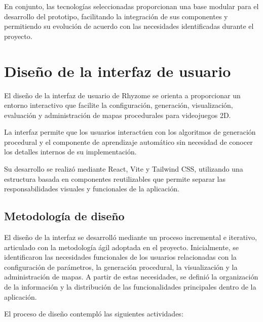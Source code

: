 En conjunto, las tecnologías seleccionadas proporcionan una base modular para el desarrollo del prototipo, facilitando la integración de sus componentes y permitiendo su evolución de acuerdo con las necesidades identificadas durante el proyecto.

\section{Diseño de la interfaz de usuario}
\label{sec:diseno_interfaz_usuario}

El diseño de la interfaz de usuario de Rhyzome se orienta a proporcionar un entorno interactivo que facilite la configuración, generación, visualización, evaluación y administración de mapas procedurales para videojuegos 2D.

La interfaz permite que los usuarios interactúen con los algoritmos de generación procedural y el componente de aprendizaje automático sin necesidad de conocer los detalles internos de su implementación.

Su desarrollo se realizó mediante React, Vite y Tailwind CSS, utilizando una estructura basada en componentes reutilizables que permite separar las responsabilidades visuales y funcionales de la aplicación.

\subsection{Metodología de diseño}

El diseño de la interfaz se desarrolló mediante un proceso incremental e iterativo, articulado con la metodología ágil adoptada en el proyecto. Inicialmente, se identificaron las necesidades funcionales de los usuarios relacionadas con la configuración de parámetros, la generación procedural, la visualización y la administración de mapas. A partir de estas necesidades, se definió la organización de la información y la distribución de las funcionalidades principales dentro de la aplicación.

El proceso de diseño contempló las siguientes actividades:

